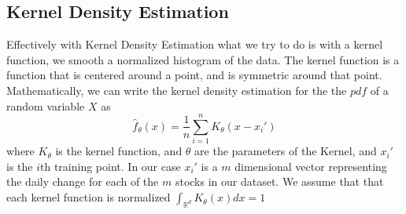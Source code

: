 \documentclass[10pt]{article}
\begin{document}
\subsection{Kernel Density Estimation}
Effectively with Kernel Density Estimation what we try to do is with a kernel function, we 
smooth a normalized histogram of the data. The kernel function is a function that is centered around a point, and is symmetric around that point.
Mathematically, we can write the kernel density estimation for the the $pdf$ of a random variable $X$ as
\begin{equation}
\hat{f}_{\theta}(x) = \frac{1}{n} \sum_{i=1}^n K_{\theta}(x-x_i')
\end{equation}
where $K_{\theta}$ is the kernel function, and $\theta$ are the parameters of the Kernel, and $x_i'$ is the $i$th training point. 
In our case $x_i'$ is a $m$ dimensional vector representing the daily change for each of the $m$ stocks in our dataset.
We assume that that each kernel function is normalized $\int_{\mathbb{R}^d} K_{\theta}(x) dx = 1$
\end{document}
